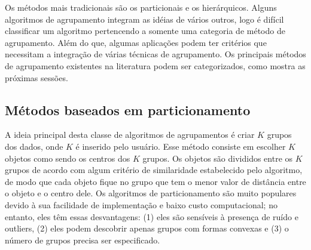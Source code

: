 Os métodos mais tradicionais são os particionais e os hierárquicos. Alguns algoritmos de agrupamento integram as idéias de vários outros, logo é difícil classificar um algoritmo pertencendo a somente uma categoria de método de agrupamento. Além do que, algumas aplicações podem ter critérios que necessitam a integração de várias técnicas de agrupamento.  Os principais métodos de agrupamento existentes na literatura podem ser categorizados, como mostra as próximas sessões.

\subsection{Métodos baseados em particionamento}
A ideia principal desta classe de algoritmos de agrupamentos é criar ${K}$ grupos dos dados, onde ${K}$ é inserido pelo usuário.
Esse método consiste em escolher ${K}$ objetos como sendo os centros dos ${K}$ grupos.
Os objetos são divididos entre os ${K}$ grupos de acordo com algum critério de similaridade
estabelecido pelo algoritmo, de modo que cada objeto fique no grupo que tem o menor valor de
distância entre o objeto e o centro dele.
Os algoritmos de particionamento são muito populares devido à sua facilidade de implementação e baixo custo computacional; no entanto, eles têm essas desvantagens: (1) eles são sensíveis à presença de ruído e outliers, (2) eles podem descobrir apenas grupos com formas convexas e (3) o número de grupos precisa ser especificado.

